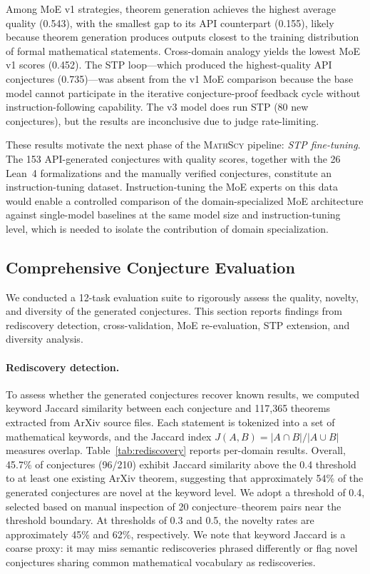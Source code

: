 \documentclass[11pt,a4paper]{article}
\newcommand{\mathscy}{\textsc{MathScy}}
\begin{document}
Among MoE v1 strategies, theorem generation achieves the highest average quality (0.543), with the smallest gap to its API counterpart (0.155), likely because theorem generation produces outputs closest to the training distribution of formal mathematical statements. Cross-domain analogy yields the lowest MoE v1 scores (0.452). The STP loop---which produced the highest-quality API conjectures (0.735)---was absent from the v1 MoE comparison because the base model cannot participate in the iterative conjecture-proof feedback cycle without instruction-following capability. The v3 model does run STP (80 new conjectures), but the results are inconclusive due to judge rate-limiting.

These results motivate the next phase of the \mathscy{} pipeline: \emph{STP fine-tuning}. The 153 API-generated conjectures with quality scores, together with the 26 Lean~4 formalizations and the manually verified conjectures, constitute an instruction-tuning dataset. Instruction-tuning the MoE experts on this data would enable a controlled comparison of the domain-specialized MoE architecture against single-model baselines at the same model size and instruction-tuning level, which is needed to isolate the contribution of domain specialization.


\subsection{Comprehensive Conjecture Evaluation}
\label{sec:comprehensive_eval}

We conducted a 12-task evaluation suite to rigorously assess the quality, novelty, and diversity of the generated conjectures. This section reports findings from rediscovery detection, cross-validation, MoE re-evaluation, STP extension, and diversity analysis.

\paragraph{Rediscovery detection.}
To assess whether the generated conjectures recover known results, we computed keyword Jaccard similarity between each conjecture and 117{,}365 theorems extracted from ArXiv source files. Each statement is tokenized into a set of mathematical keywords, and the Jaccard index $J(A,B) = |A \cap B|/|A \cup B|$ measures overlap. Table~\ref{tab:rediscovery} reports per-domain results. Overall, 45.7\% of conjectures (96/210) exhibit Jaccard similarity above the 0.4 threshold to at least one existing ArXiv theorem, suggesting that approximately 54\% of the generated conjectures are novel at the keyword level. We adopt a threshold of 0.4, selected based on manual inspection of 20 conjecture--theorem pairs near the threshold boundary. At thresholds of 0.3 and 0.5, the novelty rates are approximately 45\% and 62\%, respectively. We note that keyword Jaccard is a coarse proxy: it may miss semantic rediscoveries phrased differently or flag novel conjectures sharing common mathematical vocabulary as rediscoveries.
\end{document}
